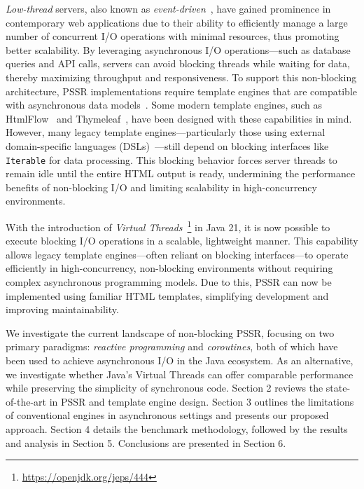 \textit{Low-thread} servers, also known as
\textit{event-driven}~\cite{event-driven-servers}, have gained prominence in
contemporary web applications due to their ability to efficiently manage a large
number of concurrent I/O operations with minimal resources, thus promoting
better scalability.
By leveraging asynchronous I/O operations—such as
database queries and API calls, servers can avoid blocking threads while
waiting for data, thereby maximizing throughput and responsiveness. To support
this non-blocking architecture, PSSR implementations require template engines
that are compatible with asynchronous data models~\cite{carvalho2023async}.
Some modern template engines, such as HtmlFlow~\cite{htmlflow} and Thymeleaf~\cite{thymeleaf}, have
been designed with these capabilities in mind. However, many legacy
template engines—particularly those using external domain-specific languages
(DSLs)~\cite{Fowler03}—still depend on blocking interfaces like
\texttt{Iterable} for data processing. This blocking behavior forces server
threads to remain idle until the entire HTML output is ready, undermining the
performance benefits of non-blocking I/O and limiting scalability in
high-concurrency environments.

With the introduction of \textit{Virtual
    Threads}~\footnote{\url{https://openjdk.org/jeps/444}} in Java 21, it is now
possible to execute blocking I/O operations in a scalable, lightweight manner.
This capability allows legacy template engines—often reliant on blocking
interfaces—to operate efficiently in high-concurrency, non-blocking
environments without requiring complex asynchronous programming models. Due to this, PSSR can now be implemented using familiar HTML templates, simplifying
development and improving maintainability.

We investigate the current landscape of non-blocking PSSR, focusing on two
primary paradigms: \textit{reactive programming} and \textit{coroutines}, both
of which have been used to achieve asynchronous I/O in the Java ecosystem. As
an alternative, we investigate whether Java’s Virtual Threads can offer
comparable performance while preserving the simplicity of synchronous code.
Section 2 reviews the state-of-the-art in PSSR and template engine design.
Section 3 outlines the limitations of conventional engines in asynchronous
settings and presents our proposed approach. Section 4 details the benchmark
methodology, followed by the results and analysis in Section 5. Conclusions are
presented in Section 6.